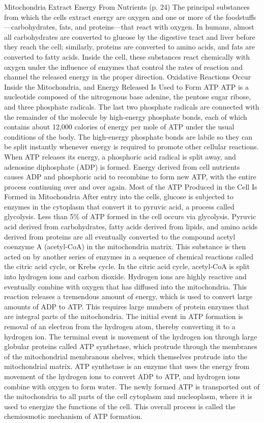 Mitochondria Extract Energy From Nutrients (p. 24) The principal substances from which the cells extract energy are oxygen and one or more of the foodstuffs—carbohydrates, fats, and proteins—that react with oxygen. In humans, almost all carbohydrates are converted to glucose by the digestive tract and liver before they reach the cell; similarly, proteins are converted to amino acids, and fats are converted to fatty acids. Inside the cell, these substances react chemically with oxygen under the influence of enzymes that control the rates of reaction and channel the released energy in the proper direction.
Oxidative Reactions Occur Inside the Mitochondria, and Energy Released Is Used to Form ATP ATP is a nucleotide composed of the nitrogenous base adenine, the pentose sugar ribose, and three phosphate radicals. The last two phosphate radicals are connected with the remainder of the molecule by high-energy phosphate bonds, each of which contains about 12,000 calories of energy per mole of ATP under the usual conditions of the body. The high-energy phosphate bonds are labile so they can be split instantly whenever energy is required to promote other cellular reactions. When ATP releases its energy, a phosphoric acid radical is split away, and adenosine diphosphate (ADP) is formed. Energy derived from cell nutrients causes ADP and phosphoric acid to recombine to form new ATP, with the entire process continuing over and over again. Most of the ATP Produced in the Cell Is Formed in Mitochondria After entry into the cells, glucose is subjected to enzymes in the cytoplasm that convert it to pyruvic acid, a process called glycolysis. Less than 5\% of ATP formed in the cell occurs via glycolysis. Pyruvic acid derived from carbohydrates, fatty acids derived from lipids, and amino acids derived from proteins are all eventually converted to the compound acetyl coenzyme A (acetyl-CoA) in the mitochondria matrix. This substance is then acted on by another series of enzymes in a sequence of chemical reactions called the citric acid cycle, or Krebs cycle. In the citric acid cycle, acetyl-CoA is split into hydrogen ions and carbon dioxide. Hydrogen ions are highly reactive and eventually combine with oxygen that has diffused into the mitochondria. This reaction releases a tremendous amount of energy, which is used to convert large amounts of ADP to ATP. This requires large numbers of protein enzymes that are integral parts of the mitochondria. The initial event in ATP formation is removal of an electron from the hydrogen atom, thereby converting it to a hydrogen ion. The terminal event is movement of the hydrogen ion through large globular proteins called ATP synthetase, which protrude through the membranes of the mitochondrial membranous shelves, which themselves protrude into the mitochondrial matrix. ATP synthetase is an enzyme that uses the energy from movement of the hydrogen ions to convert ADP to ATP, and hydrogen ions combine with oxygen to form water. The newly formed ATP is transported out of the mitochondria to all parts of the cell cytoplasm and nucleoplasm, where it is used to energize the functions of the cell. This overall process is called the chemiosmotic mechanism of ATP formation.



